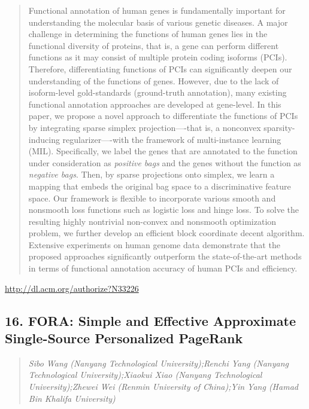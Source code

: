 \documentclass{article}
\begin{document}
\begin{quote}
Functional annotation of human genes is fundamentally important for understanding the molecular basis of various genetic diseases. A major challenge in determining the functions of human genes lies in the functional diversity of proteins, that is, a gene can perform different functions as it may consist of multiple protein coding isoforms (PCIs). Therefore, differentiating functions of PCIs can significantly deepen our understanding of the functions of genes. However, due to the lack of isoform-level gold-standards (ground-truth annotation), many existing functional annotation approaches are developed at gene-level. In this paper, we propose a novel approach to differentiate the functions of PCIs by integrating sparse simplex projection—-that is, a nonconvex sparsity-inducing regularizer—-with the framework of multi-instance learning (MIL). Specifically, we label the genes that are annotated to the function under consideration as \emph{positive bags} and the genes without the function as \emph{negative bags}. Then, by sparse projections onto simplex, we learn a mapping that embeds the original bag space to a discriminative feature space. Our framework is flexible to incorporate various smooth and nonsmooth loss functions such as logistic loss and hinge loss. To solve the resulting highly nontrivial non-convex and nonsmooth optimization problem, we further develop an efficient block coordinate decent algorithm. Extensive experiments on human genome data demonstrate that the proposed approaches significantly outperform the state-of-the-art methods in terms of functional annotation accuracy of human PCIs and efficiency.
\end{quote}

\href{http://dl.acm.org/authorize?N33226}{http://dl.acm.org/authorize?N33226}

\subsection{16. FORA: Simple and Effective Approximate Single-Source Personalized PageRank}

\begin{quote}
\footnotesize{\textit{Sibo Wang (Nanyang Technological University);Renchi Yang (Nanyang Technological University);Xiaokui Xiao (Nanyang Technological University);Zhewei Wei (Renmin University of China);Yin Yang (Hamad Bin Khalifa University)}}

\end{quote}
\end{document}
